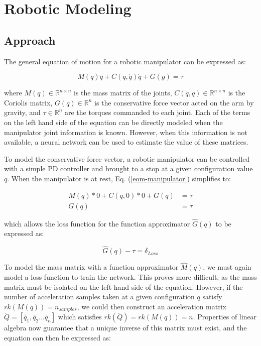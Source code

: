 \section{Robotic Modeling}
\subsection{Approach}

The general equation of motion for a robotic manipulator can be expressed as:

\begin{equation}
  \label{eom-manipulator}
  M(q)\ddot{q} + C(q,\dot{q})\dot{q} + G(g) = \tau
\end{equation}

\noindent where $M(q)\in\mathbb{R}^{n\times n}$ is the mass matrix of the joints,
$C(q,\dot{q})\in\mathbb{R}^{n\times n}$ is the Coriolis matrix,
$G(q)\in\mathbb{R}^{n}$ is the conservative force vector acted on the arm by
gravity, and $\tau\in\mathbb{R}^{n}$ are the torques commanded to each joint.
Each of the terms on the left hand side of the equation can be directly modeled
when the manipulator joint information is known.
However, when this information is not available, a neural network can be used to
estimate the value of these matrices.

To model the conservative force vector, a robotic manipulator can be controlled
with a simple PD controller and brought to a stop at a given configuration value
$q$.
When the manipulator is at rest, Eq. (\ref{eom-manipulator}) simplifies to:

\begin{align}
  \label{eom-manipulator-stopped}
  M(q)*0 + C(q,0)*0 + G(q) &= \tau\\
  G(q) &= \tau
\end{align}

\noindent which allows the loss function for the function approximator
$\hat{G}(q)$ to be expressed as:

\begin{equation}
  \label{loss-function-gq}
  \hat{G}(q) - \tau = \delta_{Loss}
\end{equation}

To model the mass matrix with a function approximator $\hat{M}(q)$, we must
again model a loss function to train the network.
This proves more difficult, as the mass matrix must be isolated on the left hand
side of the equation.
However, if the number of acceleration samples taken at a given configuration
$q$ satisfy $rk(M(q)) = n_{samples}$, we could then construct an acceleration
matrix $\ddot{Q} = [\ddot{q_{1}}, \ddot{q_{2}}\dots\ddot{q_{n}}]$ which
satisfies $rk(\ddot{Q}) = rk(M(q)) = n$.
Properties of linear algebra now guarantee that a unique inverse of this matrix
must exist, and the equation can then be expressed as:

